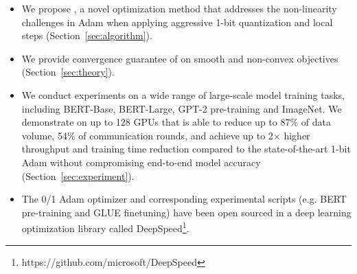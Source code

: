 \begin{itemize}[nosep,leftmargin=12pt]
    \item We propose {\myalgo}, a novel optimization method that addresses the non-linearity challenges in Adam when applying aggressive 1-bit quantization and local steps (Section~\ref{sec:algorithm}).
    \item We provide convergence guarantee of {\myalgo} on smooth and non-convex objectives (Section~\ref{sec:theory}).
    \item We conduct experiments on a wide range of large-scale model training tasks, including BERT-Base, BERT-Large, GPT-2 pre-training and ImageNet. We demonstrate on up to 128 GPUs that {\myalgo} is able to reduce up to 87\% of data volume, 54\% of communication rounds, and achieve up to 2$\times$ higher throughput and training time reduction compared to the state-of-the-art 1-bit Adam without compromising end-to-end model accuracy (Section~\ref{sec:experiment}). 
    \item The 0/1 Adam optimizer and corresponding experimental scripts (e.g. BERT pre-training and GLUE finetuning) have been open sourced in a deep learning optimization library called DeepSpeed\footnote{https://github.com/microsoft/DeepSpeed}.
\end{itemize}